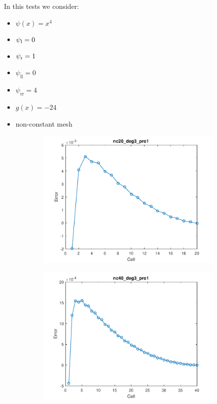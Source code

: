 \documentclass[11pt,a4paper]{article}
\theoremstyle{plain}
\theoremstyle{definition}
\begin{document}
\pagebreak
In this tests we consider:
\begin{itemize}
\item $\psi(x)=x^4$
\item $\psi_\text l=0$
\item $\psi_\text r=1$
\item $\psi_\text{ll}=0$
\item $\psi_\text{rr}=4$
\item $g(x)=-24$
\item non-constant mesh
\end{itemize}



\begin{figure}[H]
\begin{subfigure}[b]{0.48\textwidth}
\includegraphics[width=\linewidth]{../../tests_01_01/test_01_01_test48_pro1/output/plots/nc20_deg3_wei111_pro1.pdf}
\end{subfigure}\hspace*{\fill}
\begin{subfigure}[b]{0.48\textwidth}
\includegraphics[width=\linewidth]{../../tests_01_01/test_01_01_test48_pro1/output/plots/nc40_deg3_wei111_pro1.pdf}
\end{subfigure}


\end{figure}
\end{document}
